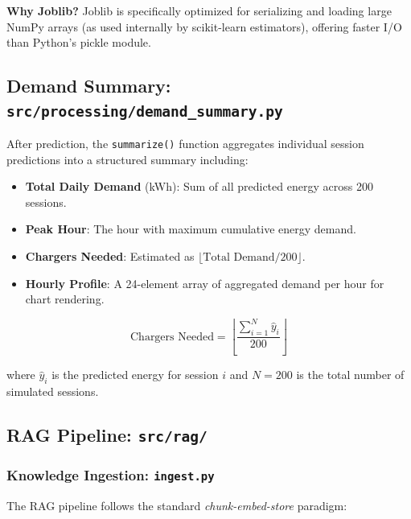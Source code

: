 \documentclass[12pt,a4paper]{article}
\newcommand{\code}[1]{\texttt{\small\color{blue!70!black}#1}}
\begin{document}
\textbf{Why Joblib?} Joblib is specifically optimized for serializing and loading large NumPy arrays (as used internally by scikit-learn estimators), offering faster I/O than Python's pickle module.

\subsection{Demand Summary: \code{src/processing/demand\_summary.py}}

After prediction, the \code{summarize()} function aggregates individual session predictions into a structured summary including:

\begin{itemize}
    \item \textbf{Total Daily Demand} (kWh): Sum of all predicted energy across 200 sessions.
    \item \textbf{Peak Hour}: The hour with maximum cumulative energy demand.
    \item \textbf{Chargers Needed}: Estimated as $\lfloor\text{Total Demand} / 200\rfloor$.
    \item \textbf{Hourly Profile}: A 24-element array of aggregated demand per hour for chart rendering.
\end{itemize}

\begin{equation}
\text{Chargers Needed} = \left\lfloor \frac{\sum_{i=1}^{N} \hat{y}_i}{200} \right\rfloor
\end{equation}

where $\hat{y}_i$ is the predicted energy for session $i$ and $N=200$ is the total number of simulated sessions.

\subsection{RAG Pipeline: \code{src/rag/}}

\subsubsection{Knowledge Ingestion: \code{ingest.py}}

The RAG pipeline follows the standard \textit{chunk-embed-store} paradigm:
\end{document}
